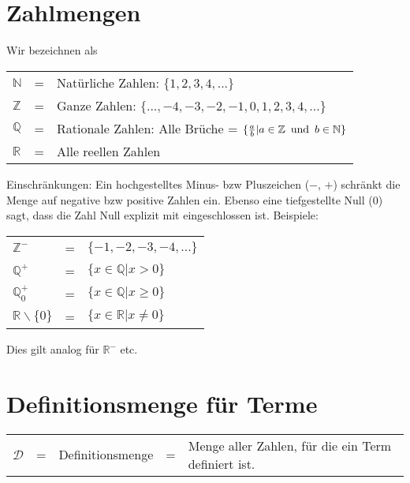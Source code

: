 



\usepackage{amssymb} %
\renewcommand{\metaHeaderLine}{Theorieblatt}
\renewcommand{\arbeitsblattTitel}{Mengenbezeichnungen}

\arbeitsblattHeader{}

\section{Zahlmengen}
Wir bezeichnen als

\begin{tabular}{lcl}
  $\mathbb{N}$ &=& Natürliche Zahlen: $\{1, 2, 3, 4, ...\}$ \\
  $\mathbb{Z}$ &=& Ganze Zahlen: $\{..., -4, -3, -2, -1, 0, 1, 2, 3, 4, ...\}$ \\
  $\mathbb{Q}$ &=& Rationale Zahlen: Alle Brüche = $\{\frac{a}{b} |
  a\in\mathbb{Z}\textrm{\, und\, } b\in\mathbb{N}\}$ \\
  $\mathbb{R}$ &=& Alle reellen Zahlen\\
\end{tabular}

Einschränkungen: Ein hochgestelltes Minus- bzw Pluszeichen ($-$, $+$)
schränkt die Menge auf negative bzw positive Zahlen ein. Ebenso eine
tiefgestellte Null ($0$) sagt, dass die Zahl Null explizit mit
eingeschlossen ist. Beispiele:

\begin{tabular}{lcl}
  $\mathbb{Z}^{-}$ &=& $\{-1, -2, -3, -4, ...\}$ \\
  $\mathbb{Q}^{+}$ &=& $\{x\in \mathbb{Q} | x > 0\}$ \\
  $\mathbb{Q}^{+}_0$ &=& $\{x\in \mathbb{Q} | x \ge 0\}$ \\
  $\mathbb{R}\backslash{}\{0\}$ &=& $\{x\in \mathbb{R} | x \ne 0\}$ \\
\end{tabular}

Dies gilt analog für $\mathbb{R}^{-}$ etc.

\section{Definitionsmenge für Terme}

\begin{tabular}{lclcp{10cm}}
  $\mathcal{D}$ &=& Definitionsmenge &=& Menge aller Zahlen, für die ein Term definiert ist.\\
\end{tabular}

